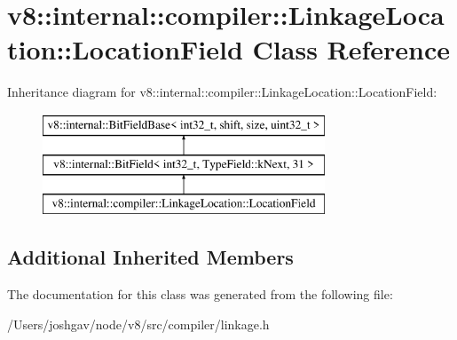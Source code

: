 \hypertarget{classv8_1_1internal_1_1compiler_1_1_linkage_location_1_1_location_field}{}\section{v8\+:\+:internal\+:\+:compiler\+:\+:Linkage\+Location\+:\+:Location\+Field Class Reference}
\label{classv8_1_1internal_1_1compiler_1_1_linkage_location_1_1_location_field}
Inheritance diagram for v8\+:\+:internal\+:\+:compiler\+:\+:Linkage\+Location\+:\+:Location\+Field\+:\begin{figure}[H]
\begin{center}
\leavevmode
\includegraphics[height=3.000000cm]{classv8_1_1internal_1_1compiler_1_1_linkage_location_1_1_location_field}
\end{center}
\end{figure}
\subsection*{Additional Inherited Members}


The documentation for this class was generated from the following file\+:\begin{DoxyCompactItemize}
\item 
/\+Users/joshgav/node/v8/src/compiler/linkage.\+h\end{DoxyCompactItemize}
